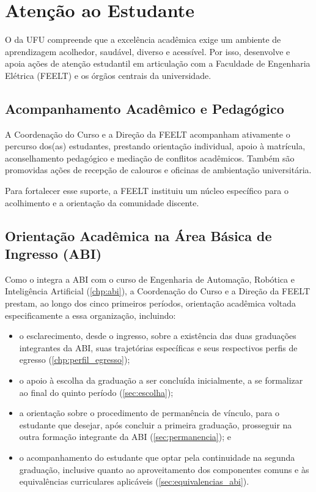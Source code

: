\chapter{Atenção ao Estudante}
\label{chp:atendimento_estudante}

O \ppccurso da UFU compreende que a excelência acadêmica exige um ambiente de aprendizagem acolhedor, saudável, diverso e acessível. Por isso, desenvolve e apoia ações de atenção estudantil em articulação com a Faculdade de Engenharia Elétrica (FEELT) e os órgãos centrais da universidade.

\section{Acompanhamento Acadêmico e Pedagógico}

A Coordenação do Curso e a Direção da FEELT acompanham ativamente o percurso dos(as) estudantes, prestando orientação individual, apoio à matrícula, aconselhamento pedagógico e mediação de conflitos acadêmicos. Também são promovidas ações de recepção de calouros e oficinas de ambientação universitária.

Para fortalecer esse suporte, a FEELT instituiu um núcleo específico para o acolhimento e a orientação da comunidade discente.

\section{Orientação Acadêmica na Área Básica de Ingresso (ABI)}
\label{sec:orientacao_academica_abi}

Como o \ppccurso integra a ABI com o curso de Engenharia de Automação, Robótica e Inteligência Artificial (\autoref{chp:abi}), a Coordenação do Curso e a Direção da FEELT prestam, ao longo dos cinco primeiros períodos, orientação acadêmica voltada especificamente a essa organização, incluindo:

\begin{itemize}
    \item o esclarecimento, desde o ingresso, sobre a existência das duas graduações integrantes da ABI, suas trajetórias específicas e seus respectivos perfis de egresso (\autoref{chp:perfil_egresso});
    \item o apoio à escolha da graduação a ser concluída inicialmente, a se formalizar ao final do quinto período (\autoref{sec:escolha});
    \item a orientação sobre o procedimento de permanência de vínculo, para o estudante que desejar, após concluir a primeira graduação, prosseguir na outra formação integrante da ABI (\autoref{sec:permanencia}); e
    \item o acompanhamento do estudante que optar pela continuidade na segunda graduação, inclusive quanto ao aproveitamento dos componentes comuns e às equivalências curriculares aplicáveis (\autoref{sec:equivalencias_abi}).
\end{itemize}

